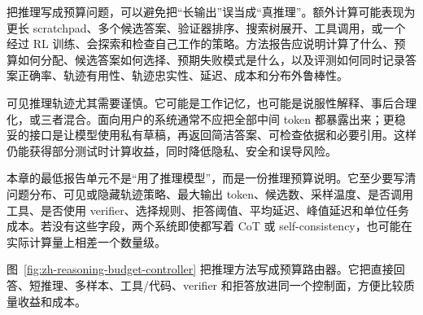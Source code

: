 \documentclass[UTF8,zihao=-4,openany]{ctexbook}
\begin{document}
把推理写成预算问题，可以避免把“长输出”误当成“真推理”。额外计算可能表现为更长 scratchpad、多个候选答案、验证器排序、搜索树展开、工具调用，或一个经过 RL 训练、会探索和检查自己工作的策略。方法报告应说明计算了什么、预算如何分配、候选答案如何选择、预期失败模式是什么，以及评测如何同时记录答案正确率、轨迹有用性、轨迹忠实性、延迟、成本和分布外鲁棒性。

可见推理轨迹尤其需要谨慎。它可能是工作记忆，也可能是说服性解释、事后合理化，或三者混合。面向用户的系统通常不应把全部中间 token 都暴露出来；更稳妥的接口是让模型使用私有草稿，再返回简洁答案、可检查依据和必要引用。这样仍能获得部分测试时计算收益，同时降低隐私、安全和误导风险。

本章的最低报告单元不是“用了推理模型”，而是一份推理预算说明。它至少要写清问题分布、可见或隐藏轨迹策略、最大输出 token、候选数、采样温度、是否调用工具、是否使用 verifier、选择规则、拒答阈值、平均延迟、峰值延迟和单位任务成本。若没有这些字段，两个系统即使都写着 CoT 或 self-consistency，也可能在实际计算量上相差一个数量级。

图~\ref{fig:zh-reasoning-budget-controller} 把推理方法写成预算路由器。它把直接回答、短推理、多样本、工具/代码、verifier 和拒答放进同一个控制面，方便比较质量收益和成本。
\end{document}
